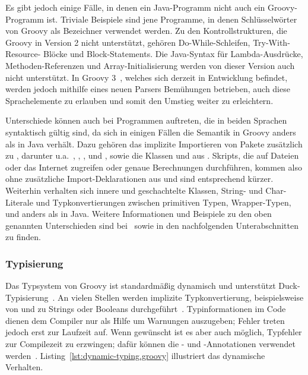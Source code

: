 Es gibt jedoch einige Fälle, in denen ein Java-Programm nicht auch ein Groovy-Programm ist.
Triviale Beispiele sind jene Programme, in denen Schlüsselwörter von Groovy als Bezeichner verwendet werden.
Zu den Kontrollstrukturen, die Groovy in Version 2 nicht unterstützt, gehören Do-While-Schleifen, Try-With-Resource- Blöcke und Block-Statements.
Die Java-Syntax für Lambda-Ausdrücke, Methoden-Referenzen und Array-Initialisierung werden von dieser Version auch nicht unterstützt.
In Groovy 3~\cite{groovy-lang:release3}, welches sich derzeit in Entwicklung befindet, werden jedoch mithilfe eines neuen Parsers Bemühungen betrieben, auch diese Sprachelemente zu erlauben und somit den Umstieg weiter zu erleichtern.

Unterschiede können auch bei Programmen auftreten, die in beiden Sprachen syntaktisch gültig sind, da sich in einigen Fällen die Semantik in Groovy anders als in Java verhält.
Dazu gehören das implizite Importieren von Pakete zusätzlich zu , darunter u.a.~, , ,  und , sowie die Klassen  und  aus .
Skripts, die auf Dateien oder das Internet zugreifen oder genaue Berechnungen durchführen, kommen also ohne zusätzliche Import-Deklarationen aus und sind entsprechend kürzer.
Weiterhin verhalten sich innere und geschachtelte Klassen, String- und Char-Literale und Typkonvertierungen zwischen primitiven Typen, Wrapper-Typen,  und  anders als in Java.
Weitere Informationen und Beispiele zu den oben genannten Unterschieden sind bei~\cite{groovy-lang:differences} sowie in den nachfolgenden Unterabschnitten zu finden.

\subsubsection{Typisierung}\label{subsubsec:typisierung}

Das Typsystem von Groovy ist standardmäßig dynamisch und unterstützt Duck-Typisierung~\cite[Abs.~6.]{groovy-lang:semantics}.
An vielen Stellen werden implizite Typkonvertierung, beispielsweise von und zu Strings oder Booleans durchgeführt~\cite[Abs.~3.]{groovy-lang:semantics}.
Typinformationen im Code dienen dem Compiler nur als Hilfe um Warnungen auszugeben; Fehler treten jedoch erst zur Laufzeit auf.
Wenn gewünscht ist es aber auch möglich, Typfehler zur Compilezeit zu erzwingen; dafür können die - und -Annotationen verwendet werden~\cite[Abs.~6.2.]{groovy-lang:semantics}.
Listing~\ref{lst:dynamic-typing.groovy} illustriert das dynamische Verhalten.

